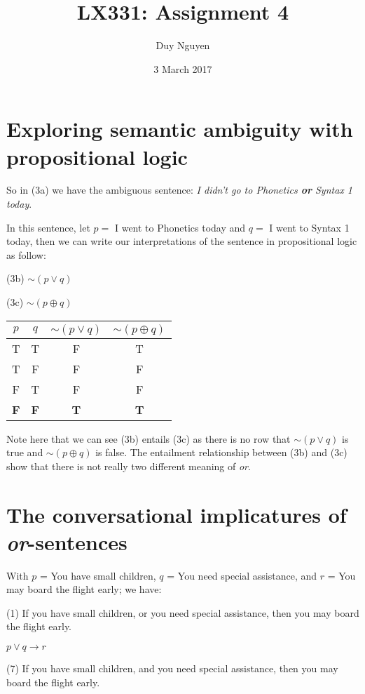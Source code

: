 \documentclass{article}
\title{LX331: Assignment 4}
\author{Duy Nguyen}
\date{3 March 2017}
\begin{document}
\maketitle

\section{Exploring semantic ambiguity with propositional logic}

So in (3a) we have the ambiguous sentence: \textit{I didn’t go to Phonetics \textbf{or} Syntax 1 today}.

In this sentence, let  $p =$ I went to Phonetics today and $q =$ I went to Syntax 1 today, then we can write our interpretations of the sentence in propositional logic as follow:

(3b) $\sim (p \lor q)$

(3c) $\sim (p \oplus q)$
\begin{center}
\begin{tabular}{cc|cc}
    $p$ & $q$ &  $\sim (p \lor q)$ & $\sim (p \oplus q)$ \\ \hline
    T & T & F & T \\
    T & F & F & F \\
    F & T & F & F \\
    \textbf{F} & \textbf{F} & \textbf{T} & \textbf{T} \\
\end{tabular}
\end{center}

Note here that we can see (3b) entails (3c) as there is no row that $\sim (p \lor q)$ is true and $\sim (p \oplus q)$ is false. The entailment relationship between (3b) and (3c) show that there is not really two different meaning of \textit{or}.

\section{The conversational implicatures of \textit{or}-sentences}

With $p$ = You have small children, $q$ = You need special assistance, and $r$ = You may board the flight early; we have:

(1) If you have small children, or you need special assistance, then you may board the flight early.

$ p \lor q \rightarrow r$

(7) If you have small children, and you need special assistance, then you may board the flight early.
\end{document}
